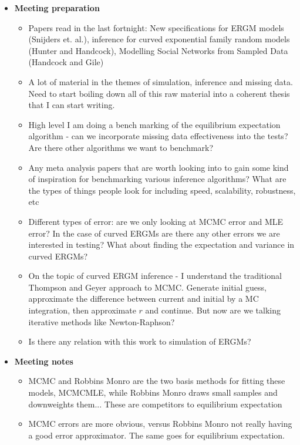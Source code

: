 \begin{itemize}
\item \textbf{Meeting preparation}
    \begin{itemize}
        \item Papers read in the last fortnight: New specifications for ERGM models (Snijders et. al.), inference for curved exponential family random models (Hunter and Handcock), Modelling Social Networks from Sampled Data (Handcock and Gile)
        \item A lot of material in the themes of simulation, inference and missing data. Need to start boiling down all of this raw material into a coherent thesis that I can start writing.
        \item High level I am doing a bench marking of the equilibrium expectation algorithm - can we incorporate missing data effectiveness into the tests? Are there other algorithms we want to benchmark? 
        \item Any meta analysis papers that are worth looking into to gain some kind of inspiration for benchmarking various inference algorithms? What are the types of things people look for including speed, scalability, robustness, etc
        \item Different types of error: are we only looking at MCMC error and MLE error? In the case of curved ERGMs are there any other errors we are interested in testing? What about finding the expectation and variance in curved ERGMs?
        \item On the topic of curved ERGM inference - I understand the traditional Thompson and Geyer approach to MCMC. Generate initial guess, approximate the difference between current and initial by a MC integration, then approximate $r$ and continue. But now are we talking iterative methods like Newton-Raphson?
        \item Is there any relation with this work to simulation of ERGMs?
    \end{itemize}
    \item \textbf{Meeting notes}
    \begin{itemize}
        \item MCMC and Robbins Monro are the two basis methods for fitting these models, MCMCMLE, while Robbins Monro draws small samples and downweights them... These are competitors to equilibrium expectation 
        \item MCMC errors are more obvious, versus Robbins Monro not really having a good error approximator. The same goes for equilibrium expectation. 

\end{itemize}
\end{itemize}

